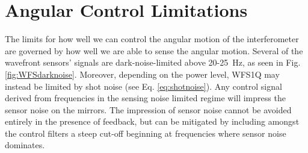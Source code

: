 \section{Angular Control Limitations}
\label{sec:ASClimits}
The limits for how well we can control the angular motion of the interferometer are governed by how well we are able to sense the angular motion. Several of the wavefront sensors' signals are dark-noise-limited above 20-25~Hz, as seen in Fig. \ref{fig:WFSdarknoise}. Moreover, depending on the power level, WFS1Q may instead be limited by shot noise (see Eq. \ref{eq:shotnoise}). Any control signal derived from frequencies in the sensing noise limited regime will impress the sensor noise on the mirrors. The impression of sensor noise cannot be avoided entirely in the presence of feedback, but can be mitigated by including amongst the control filters a steep cut-off beginning at frequencies where sensor noise dominates. 

